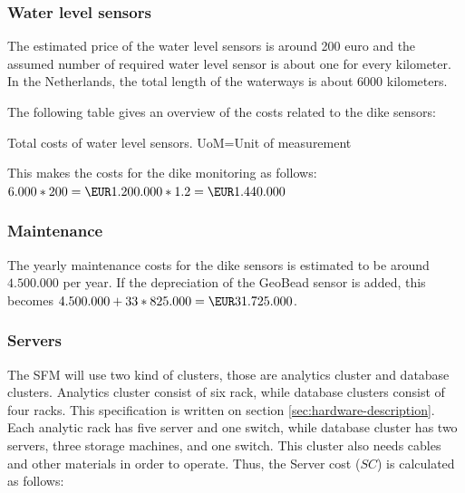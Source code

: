 \subsubsection{Water level sensors}

The estimated price of the water level sensors is around 200 euro and the assumed number of required water level sensor is about one for every kilometer. In the Netherlands, the total length of the waterways is about $6000$ kilometers\cite{cbs-waterways}.

The following table gives an overview of the costs related to the dike sensors:

\begin{table}[H]
	\label{table:total-dev-costs3} 
	\caption{Total costs of water level sensors. UoM=Unit of measurement}
\end{table}

This makes the costs for the dike monitoring as follows: \\
$ 6.000 * 200 = \EUR1.200.000 * 1.2 = \EUR1.440.000$\\

\subsubsection{Maintenance}


\newcommand{\installationCosts}{412.500.000}

The yearly maintenance costs for the dike sensors is estimated to be around \EUR$4.500.000$ per year. If the depreciation of the GeoBead sensor is added, this becomes $4.500.000 + 33*825.000 = \EUR31.725.000$. 

\subsubsection{Servers}
The \gls{SFM} will use two kind of clusters, those are analytics cluster and database clusters. Analytics cluster consist of six rack, while database clusters consist of four racks. This specification is written on section \ref{sec:hardware-description}. Each analytic rack has five server and one switch, while database cluster has two servers, three storage machines, and one switch. This cluster also needs cables and other materials in order to operate. Thus, the Server cost ($SC$) is calculated as follows:


